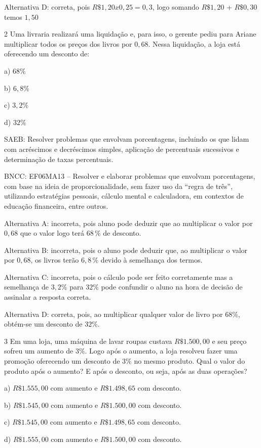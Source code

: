 Alternativa D: correta, pois $R\$1,20 x 0,25 = 0,3$, logo somando $R\$1,20$
+ $R\$0,30$ temos $1,50$

\num{2}  Uma livraria realizará uma liquidação e, para isso, o gerente pediu
para Ariane multiplicar todos os preços dos livros por $0,68$. Nessa
liquidação, a loja está oferecendo um desconto de:

a) $68\%$

b) $6,8\%$

c) $3,2\%$

d) $32\%$

SAEB: Resolver problemas que envolvam porcentagens, incluindo os que
lidam com acréscimos e decréscimos simples, aplicação de percentuais
sucessivos e determinação de taxas percentuais.

BNCC: EF06MA13 -- Resolver e elaborar problemas que envolvam
porcentagens, com base na ideia de proporcionalidade, sem fazer uso da
``regra de três'', utilizando estratégias pessoais, cálculo mental e
calculadora, em contextos de educação financeira, entre outros.

Alternativa A: incorreta, pois aluno pode deduzir que ao multiplicar o
valor por $0,68$ que o valor logo terá $68\,\%$ de desconto.

Alternativa B: incorreta, pois o aluno pode deduzir que, ao multiplicar
o valor por $0,68$, os livros terão $6,8\,\%$ devido à semelhança dos termos.

Alternativa C: incorreta, pois o cálculo pode ser feito corretamente mas
a semelhança de $3,2\%$ para $32\%$ pode confundir o aluno na hora de
decisão de assinalar a resposta correta.

Alternativa D: correta, pois, ao multiplicar qualquer valor de livro por
68\%, obtém-se um desconto de $32\%$.

\num{3}  Em uma loja, uma máquina de lavar roupas custava $R\$1.500,00$ e seu
preço sofreu um aumento de $3\%$. Logo após o aumento, a loja resolveu
fazer uma promoção oferecendo um desconto de $3\%$ no mesmo produto. Qual
o valor do produto após o aumento? E após o desconto, ou seja, após as
duas operações?

a) $R\$1.555,00$ com aumento e $R\$1.498,65$ com desconto.

b) $R\$1.545,00$ com aumento e $R\$1.500,00$ com desconto.

c) $R\$1.545,00$ com aumento e $R\$1.498,65$ com desconto.

d) $R\$1.555,00$ com aumento e $R\$1.500,00$ com desconto.

